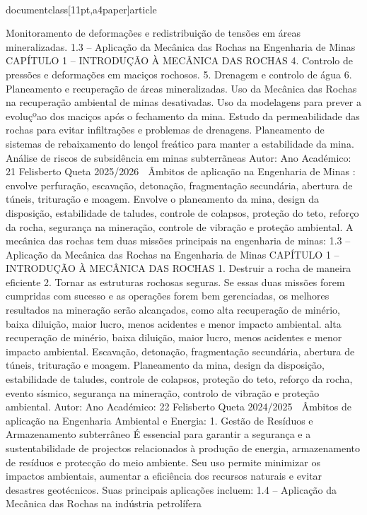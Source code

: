 \\documentclass[11pt,a4paper]{article}
\begin{document}
Monitoramento de deformações e redistribuição de tensões em áreas 
mineralizadas.
1.3 – Aplicação da Mecânica das Rochas na Engenharia de Minas
CAPÍTULO 1 
–
 INTRODUÇÃO À MECÂNICA DAS ROCHAS
4. Controlo de pressões e deformações em 
maciços rochosos.
5. Drenagem e controlo de água
6. Planeamento e recuperação de áreas 
mineralizadas.
Uso da Mecânica das Rochas na recuperação ambiental de minas 
desativadas.
Uso da modelagens para prever a evoluçºao dos maciços após o 
fechamento da mina.
Estudo da permeabilidade das rochas para evitar infiltrações e
problemas de drenagens.
Planeamento de sistemas de rebaixamento do lençol freático para 
manter a estabilidade da mina.
Análise de riscos de subsidência em minas subterrãneas
Autor:
Ano Académico:
21
Felisberto Queta
2025/2026

 Âmbitos de aplicação na Engenharia de Minas
:
envolve perfuração, escavação, detonação, fragmentação secundária,
abertura de túneis, trituração e moagem.
Envolve o planeamento da mina, design da disposição, estabilidade de 
taludes, controle de colapsos, proteção do teto, reforço da rocha, 
segurança na mineração, controle de vibração e proteção ambiental.
A mecânica das rochas tem duas missões principais na engenharia de minas:
1.3 – Aplicação da Mecânica das Rochas na Engenharia de Minas
CAPÍTULO 1 
–
 INTRODUÇÃO À MECÂNICA DAS ROCHAS
1. Destruir a rocha de maneira eficiente
2. Tornar as estruturas rochosas seguras.
Se essas duas missões forem cumpridas com sucesso e as operações forem bem gerenciadas, os melhores resultados na 
mineração serão alcançados, como alta recuperação de minério, baixa diluição, maior lucro, menos acidentes e menor 
impacto ambiental.
alta recuperação de 
minério, baixa 
diluição, maior lucro, 
menos acidentes e 
menor impacto 
ambiental.
Escavação, detonação, 
fragmentação 
secundária, abertura de 
túneis, trituração e 
moagem.
Planeamento da mina, 
design da disposição, 
estabilidade de taludes, 
controle de colapsos, 
proteção do teto, reforço 
da rocha, evento 
sísmico, segurança na 
mineração, controlo de 
vibração e proteção 
ambiental.
Autor:
Ano Académico:
22
Felisberto Queta
2024/2025

 Âmbitos de aplicação 
na Engenharia Ambiental e Energia:
1. Gestão de Resíduos e Armazenamento subterrâneo
É essencial para garantir a segurança e a sustentabilidade de projectos relacionados à produção de energia,
armazenamento de resíduos e protecção do meio ambiente. Seu uso permite minimizar os impactos ambientais, aumentar a
eficiência dos recursos naturais e evitar desastres geotécnicos. Suas principais aplicações incluem:
1.4 – Aplicação da Mecânica das Rochas na indústria petrolífera
\end{document}
